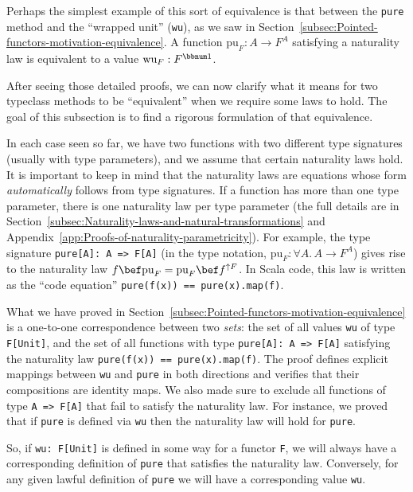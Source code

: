 Perhaps the simplest example of this sort of equivalence is that between
the \lstinline!pure! method and the \textsf{``}wrapped unit\textsf{''} (\lstinline!wu!),
as we saw in Section~\ref{subsec:Pointed-functors-motivation-equivalence}.
A function $\text{pu}_{F}:A\rightarrow F^{A}$ satisfying a naturality
law is equivalent to a value $\text{wu}_{F}:F^{\bbnum 1}$. 

After seeing those detailed proofs, we can now clarify what it means
for two typeclass methods to be \textsf{``}equivalent\textsf{''} when we require some
laws to hold. The goal of this subsection is to find a rigorous formulation
of that equivalence.

In each case seen so far, we have two functions with two different
type signatures (usually with type parameters), and we assume that
certain naturality laws hold. It is important to keep in mind that
the naturality laws are equations whose form \emph{automatically}
follows from type signatures. If a function has more than one type
parameter, there is one naturality law per type parameter (the full
details are in Section~\ref{subsec:Naturality-laws-and-natural-transformations}
and Appendix~\ref{app:Proofs-of-naturality-parametricity}). For
example, the type signature \lstinline!pure[A]: A => F[A]! (in the
type notation, $\text{pu}_{F}:\forall A.\,A\rightarrow F^{A}$) gives
rise to the naturality law $f\bef\text{pu}_{F}=\text{pu}_{F}\bef f^{\uparrow F}$.
In Scala code, this law is written as the \textsf{``}code equation\textsf{''} \lstinline!pure(f(x)) == pure(x).map(f)!.

What we have proved in Section~\ref{subsec:Pointed-functors-motivation-equivalence}
is a one-to-one correspondence between two \emph{sets}: the set of
all values \lstinline!wu! of type \lstinline!F[Unit]!, and the set
of all functions with type \lstinline!pure[A]: A => F[A]! satisfying
the naturality law \lstinline!pure(f(x)) == pure(x).map(f)!. The
proof defines explicit mappings between \lstinline!wu! and \lstinline!pure!
in both directions and verifies that their compositions are identity
maps. We also made sure to exclude all functions of type \lstinline!A => F[A]!
that fail to satisfy the naturality law. For instance, we proved that
if \lstinline!pure! is defined via \lstinline!wu! then the naturality
law will hold for \lstinline!pure!.

So, if \lstinline!wu: F[Unit]! is defined in some way for a functor
\lstinline!F!, we will always have a corresponding definition of
\lstinline!pure! that satisfies the naturality law. Conversely, for
any given lawful definition of \lstinline!pure! we will have a corresponding
value \lstinline!wu!.

